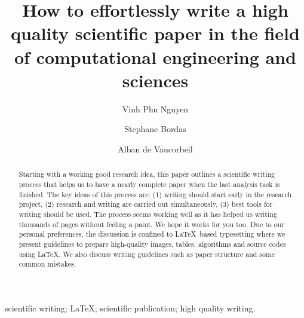 \documentclass[authoryear,3p,times,preprint,review,fleqn]{elsarticle}
\numberwithin{equation}{section}
\theoremstyle{remark}
\begin{document}

\begin{frontmatter}



\title{\textbf{How to effortlessly write a high quality scientific paper in the field of computational engineering and sciences }}



\author[1]{Vinh Phu Nguyen}
\author[2]{Stephane Bordas}
\author[3]{Alban de Vaucorbeil}


\address[1]{Department of Civil Engineering, Monash University, Clayton 3800, VIC, Australia}
\address[2]{Institute of Computational Engineering, University of Luxembourg, Faculty of Sciences Communication and Technology, Luxembourg}
\address[3]{Institute for Frontier Materials, Deakin University, Geelong, VIC, 3216, Australia}



\begin{abstract}
Starting with a working good research idea, this paper outlines a scientific writing process that helps us to have a nearly complete paper when the last analysis task is finished.  The key ideas of this process are: (1) writing should start early in the research project, (2) research and writing are carried out simultaneously, (3) best tools for writing should be used.  The process seems working well as it has helped us writing thousands of pages without feeling a paint. We hope it works for you too.  Due to our personal preferences, the discussion is confined to \LaTeX\ based typesetting where we present guidelines to prepare high-quality images, tables, algorithms and source codes using \LaTeX. We also discuss writing guidelines such as paper structure and some common mistakes.
\end{abstract}


\begin{keyword}
 scientific writing; \LaTeX; scientific publication; high quality writing.
\end{keyword}


\end{frontmatter}
\end{document}
